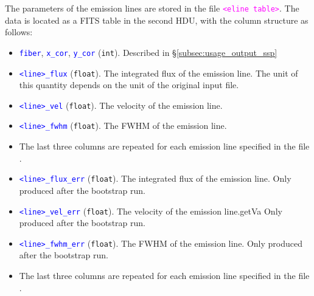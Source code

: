 \documentclass[usenatbib,usegraphicx,useAMS,onecolumn]{mn2e}
\newcommand{\codeline}[1]{\lstinline|#1|}
\newcommand{\tblcol}[1]{\textcolor{blue}{\codeline{#1}}}
\newcommand{\fname}[1]{\textcolor{magenta}{\codeline{#1}}}
\begin{document}
The parameters of the emission lines are stored in the file \fname{<eline table>}.
The data is located as a FITS table in the second HDU, with the column structure as follows:
\begin{itemize}
    \item \tblcol{fiber}, \tblcol{x_cor}, \tblcol{y_cor} (\texttt{int}).
        Described in \S\ref{subsec:usage_output_ssp}
    \item \tblcol{<line>_flux} (\texttt{float}).
        The integrated flux of the emission line.
        The unit of this quantity depends on the unit of the original input file.
    \item \tblcol{<line>_vel} (\texttt{float}).
        The velocity of the emission line.
    \item \tblcol{<line>_fwhm} (\texttt{float}).
        The FWHM of the emission line.
    \item The last three columns are repeated for each emission line specified in the file .
    \item \tblcol{<line>_flux_err} (\texttt{float}).
        The integrated flux of the emission line.
        Only produced after the bootstrap run.
    \item \tblcol{<line>_vel_err} (\texttt{float}).
        The velocity of the emission line.getVa
        Only produced after the bootstrap run.
    \item \tblcol{<line>_fwhm_err} (\texttt{float}).
        The FWHM of the emission line.
        Only produced after the bootstrap run.
    \item The last three columns are repeated for each emission line specified in the file .
\end{itemize}
\end{document}
